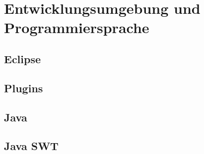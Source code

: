 \section{Entwicklungsumgebung und Programmiersprache}
\paragraph{}



\subsection{Eclipse}
\paragraph{}




\subsection{Plugins}
\paragraph{}




\subsection{Java}
\paragraph{}




\subsection{Java SWT}
\paragraph{}

